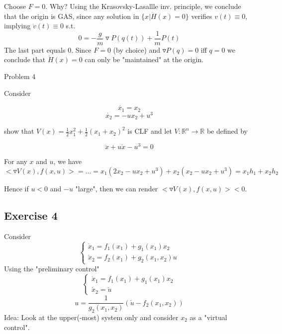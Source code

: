 Choose $F = 0$. Why? Using the Krasovsky-Lasallle inv. principle, we conclude that the origin is GAS, since any solution in $\{ x| \dot{H}(x) = 0 \}$ verifies $v(t) \equiv 0$, implying $\dot{v}(t) \equiv 0$ s.t. 
\begin{equation*}
0 = - \frac{g}{m} \triangledown P(q(t)) + \frac{1}{m} P(t)
\end{equation*}
The last part equals 0.  Since $F = 0$ (by choice) and $\triangledown P(q) = 0$ iff $q = 0$ we conclude that $\dot{H}(x) = 0$ can only be "maintained" at the origin.

Problem 4

Consider 

\begin{equation*}
\dot{x_1} = x_2
\end{equation*}
\begin{equation*}
\dot{x_2} = - ux_2 + u^3
\end{equation*}

show that $V(x) = \frac{1}{2} x_1^2 + \frac{1}{2}(x_1 +x_2)^2$ is CLF and let $V: \mathbb{R}^n \to \mathbb{R}$ be defined by

\begin{equation*}
\ddot{x} + u\dot{x} - u^3 = 0
\end{equation*}

For any $x$ and $u$, we have $<\triangledown V(x), f(x,u)> = \dots = x_1(2x_2 -ux_2 + u^3) + x_2(x_2 - ux_2 + u^3) = x_1h_1 + x_2h_2$

Hence if $u < 0$ and $-u$ "large", then we can render $<\triangledown V(x), f(x,u)> < 0$.

   
    \subsection{Exercise 4}
    
    Consider
    \begin{equation} \label{ex:4:theory:1}
    \left\{\begin{array}{ll}
        \dot x_1 = f_1(x_1)+g_1(x_1)x_2 \\
        \dot x_2 = f_2(x_1)+g_2(x_1,x_2)u
    \end{array} \right.
    \end{equation}
    Using the "preliminary control"
    \begin{equation} \label{ex:4:theory:2}
    \left\{\begin{array}{ll}
        \dot x_1 = f_1(x_1)+g_1(x_1)x_2 \\
        \dot x_2 = \check u
    \end{array} \right.
    \end{equation}
    $$u=\frac{1}{g_2(x_1,x_2)}(\check u - f_2(x_1,x_2))$$
    Idea: Look at the upper(-most) system only and consider $x_2$ as a "virtual control". \\
    
